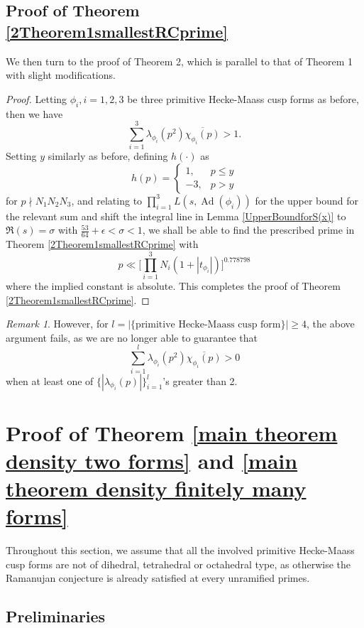 \documentclass[10pt,leqno]{amsart}
\theoremstyle{plain}
\theoremstyle{definition}
\theoremstyle{remark}
\newtheorem*{remark}{Remark}
\numberwithin{equation}{section}
\newcommand{\Ad}{\operatorname{Ad}}
\begin{document}
\subsection{Proof of Theorem \ref{2Theorem1smallestRCprime}}
We then turn to the proof of Theorem 2, which is parallel to that of Theorem 1 with slight modifications.
\begin{proof}
Letting $\phi_i, i = 1,2,3$ be three primitive Hecke-Maass cusp forms as before,
    then we have 
    \[
        \sum_{i=1}^3 \lambda_{\phi_i}(p^2)\overline{\chi_{\phi_i}(p)} > 1.
    \]
    Setting $y$ similarly as before, defining $h(\cdot)$ as 
    \[
        h(p) = \begin{cases}
                1, &  p \leq y \\
                -3, & p > y
                \end{cases}
    \]
    for $p \nmid N_1N_2N_3$, and relating to $\prod_{i=1}^3L(s, \Ad(\phi_i))$ for the upper bound 
    for the relevant sum and shift the integral line in Lemma \ref{UpperBoundforS(x)} to $\Re(s) = \sigma$ with $\frac{53}{64} +\epsilon < \sigma < 1$, we shall be able to find the prescribed prime in Theorem \ref{2Theorem1smallestRCprime} with 
    \[
        p \ll \big[\prod_{i=1}^3N_i(1+|t_{\phi_i}|)\big]^{0.778798}
    \]
    where the implied constant is absolute.
    This completes the proof of Theorem \ref{2Theorem1smallestRCprime}.
\end{proof}
    
\begin{remark}
    However, for $l = |\{\text{primitive Hecke-Maass cusp form}\}| \geq 4$, the above argument 
    fails, as we are no longer able to guarantee that 
    \[ 
        \sum_{i=1}^{l}\lambda_{\phi_{i}}(p^2)\overline{\chi_{\phi_i}(p)} > 0
    \]
    when at least one of $\{|\lambda_{\phi_i}(p)|\}_{i=1}^l$'s greater than 2.
\end{remark}



    
\section{Proof of Theorem \ref{main theorem density two forms} and \ref{main theorem density finitely many forms}}
Throughout this section, we assume that all the involved primitive Hecke-Maass cusp forms  are not of dihedral, tetrahedral or octahedral type, as otherwise the Ramanujan conjecture is already satisfied at every unramified primes.

\subsection{Preliminaries }
\end{document}
